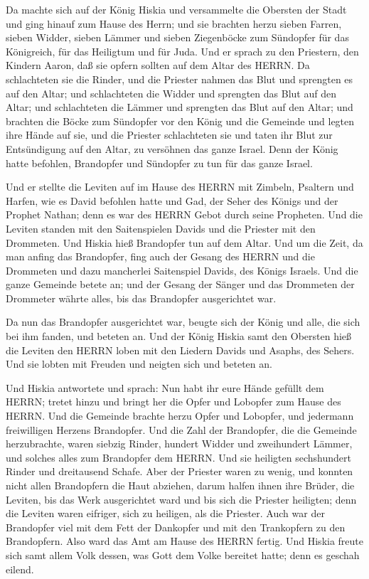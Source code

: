  Da machte sich auf der König Hiskia und versammelte die
Obersten der Stadt und ging hinauf zum Hause des Herrn; 
und sie brachten herzu sieben Farren, sieben Widder, sieben Lämmer und
sieben Ziegenböcke zum Sündopfer für das Königreich, für das Heiligtum
und für Juda. Und er sprach zu den Priestern, den Kindern Aaron, daß sie
opfern sollten auf dem Altar des HERRN.  Da schlachteten
sie die Rinder, und die Priester nahmen das Blut und sprengten es auf
den Altar; und schlachteten die Widder und sprengten das Blut auf den
Altar; und schlachteten die Lämmer und sprengten das Blut auf den Altar;
 und brachten die Böcke zum Sündopfer vor den König und die
Gemeinde und legten ihre Hände auf sie,  und die Priester
schlachteten sie und taten ihr Blut zur Entsündigung auf den Altar, zu
versöhnen das ganze Israel. Denn der König hatte befohlen, Brandopfer
und Sündopfer zu tun für das ganze Israel.

 Und er stellte die Leviten auf im Hause des HERRN mit
Zimbeln, Psaltern und Harfen, wie es David befohlen hatte und Gad, der
Seher des Königs und der Prophet Nathan; denn es war des HERRN Gebot
durch seine Propheten.  Und die Leviten standen mit den
Saitenspielen Davids und die Priester mit den Drommeten. 
Und Hiskia hieß Brandopfer tun auf dem Altar. Und um die Zeit, da man
anfing das Brandopfer, fing auch der Gesang des HERRN und die Drommeten
und dazu mancherlei Saitenspiel Davids, des Königs Israels.
 Und die ganze Gemeinde betete an; und der Gesang der
Sänger und das Drommeten der Drommeter währte alles, bis das Brandopfer
ausgerichtet war.

 Da nun das Brandopfer ausgerichtet war, beugte sich der
König und alle, die sich bei ihm fanden, und beteten an. 
Und der König Hiskia samt den Obersten hieß die Leviten den HERRN loben
mit den Liedern Davids und Asaphs, des Sehers. Und sie lobten mit
Freuden und neigten sich und beteten an.

 Und Hiskia antwortete und sprach: Nun habt ihr eure Hände
gefüllt dem HERRN; tretet hinzu und bringt her die Opfer und Lobopfer
zum Hause des HERRN. Und die Gemeinde brachte herzu Opfer und Lobopfer,
und jedermann freiwilligen Herzens Brandopfer.  Und die
Zahl der Brandopfer, die die Gemeinde herzubrachte, waren siebzig
Rinder, hundert Widder und zweihundert Lämmer, und solches alles zum
Brandopfer dem HERRN.  Und sie heiligten sechshundert
Rinder und dreitausend Schafe.  Aber der Priester waren zu
wenig, und konnten nicht allen Brandopfern die Haut abziehen, darum
halfen ihnen ihre Brüder, die Leviten, bis das Werk ausgerichtet ward
und bis sich die Priester heiligten; denn die Leviten waren eifriger,
sich zu heiligen, als die Priester.  Auch war der
Brandopfer viel mit dem Fett der Dankopfer und mit den Trankopfern zu
den Brandopfern. Also ward das Amt am Hause des HERRN fertig.
 Und Hiskia freute sich samt allem Volk dessen, was Gott
dem Volke bereitet hatte; denn es geschah eilend.

